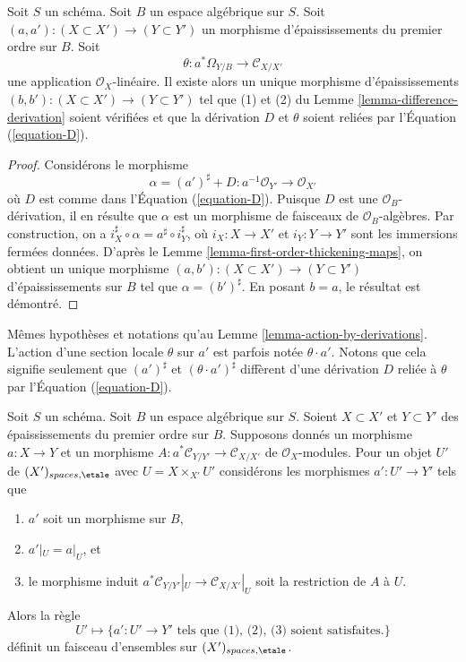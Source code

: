 \begin{lemma}
\label{lemma-action-by-derivations}
Soit $S$ un schéma. Soit $B$ un espace algébrique sur $S$.
Soit $(a, a') : (X \subset X') \to (Y \subset Y')$
un morphisme d'épaississements du premier ordre sur $B$.
Soit
$$
\theta : a^*\Omega_{Y/B} \to \mathcal{C}_{X/X'}
$$
une application $\mathcal{O}_X$-linéaire. Il existe alors un unique morphisme d'épaississements
$(b, b') : (X \subset X') \to (Y \subset Y')$ tel que
(1) et (2) du
Lemme \ref{lemma-difference-derivation}
soient vérifiées et que la dérivation $D$ et $\theta$ soient reliées par
l'Équation (\ref{equation-D}).
\end{lemma}

\begin{proof}
Considérons le morphisme
$$
\alpha = (a')^\sharp + D : a^{-1}\mathcal{O}_{Y'} \to \mathcal{O}_{X'}
$$
où $D$ est comme dans l'Équation (\ref{equation-D}). Puisque $D$ est une
$\mathcal{O}_B$-dérivation, il en résulte que $\alpha$ est un morphisme de
faisceaux de $\mathcal{O}_B$-algèbres. Par construction, on a
$i_X^\sharp \circ \alpha = a^\sharp \circ i_Y^\sharp$, où
$i_X : X \to X'$ et $i_Y : Y \to Y'$ sont les immersions fermées données. D'après le
Lemme \ref{lemma-first-order-thickening-maps},
on obtient un unique morphisme
$(a, b') : (X  \subset X') \to (Y \subset Y')$ d'épaississements
sur $B$ tel que $\alpha = (b')^\sharp$. En posant $b = a$,
le résultat est démontré.
\end{proof}

\begin{remark}
\label{remark-action-by-derivations}
Mêmes hypothèses et notations qu'au Lemme \ref{lemma-action-by-derivations}.
L'action d'une section locale $\theta$ sur $a'$ est parfois notée
$\theta \cdot a'$. Notons que cela signifie seulement que
$(a')^\sharp$ et $(\theta \cdot a')^\sharp$ diffèrent d'une dérivation
$D$ reliée à $\theta$ par l'Équation (\ref{equation-D}).
\end{remark}

\begin{lemma}
\label{lemma-sheaf}
Soit $S$ un schéma. Soit $B$ un espace algébrique sur $S$.
Soient $X \subset X'$ et $Y \subset Y'$ des épaississements du premier ordre
sur $B$. Supposons donnés un morphisme $a : X \to Y$ et un morphisme
$A : a^*\mathcal{C}_{Y/Y'} \to \mathcal{C}_{X/X'}$ de
$\mathcal{O}_X$-modules. Pour un objet $U'$ de
$(X')_{spaces, \etale}$ avec $U = X \times_{X'} U'$
considérons les morphismes $a' : U' \to Y'$ tels que
\begin{enumerate}
\item $a'$ soit un morphisme sur $B$,
\item $a'|_U = a|_U$, et
\item le morphisme induit
$a^*\mathcal{C}_{Y/Y'}|_U \to \mathcal{C}_{X/X'}|_U$
soit la restriction de $A$ à $U$.
\end{enumerate}
Alors la règle
\begin{equation}
\label{equation-sheaf}
U' \mapsto
\{a' : U' \to Y'\text{ tels que (1), (2), (3) soient satisfaites.}\}
\end{equation}
définit un faisceau d'ensembles sur $(X')_{spaces, \etale}$.
\end{lemma}

